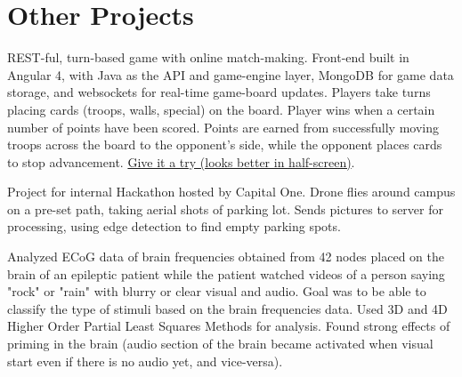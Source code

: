 \documentclass[letterpaper]{deedy-resume-openfont} %
\begin{document}
\begin{minipage}[t]{0.7\textwidth}
\sectionsep %


\section{Other Projects}



REST-ful, turn-based game with online match-making. Front-end built in Angular 4, with Java as the API and game-engine layer, MongoDB for game data storage, and websockets for real-time game-board updates. Players take turns placing cards (troops, walls, special) on the board. Player wins when a certain number of points have been scored. Points are earned from successfully moving troops across the board to the opponent's side, while the opponent places cards to stop advancement. \href{http://3.85.160.165:4200/}{Give it a try (looks better in half-screen)}.

\sectionsep %


Project for internal Hackathon hosted by Capital One. Drone flies around campus on a pre-set path, taking aerial shots of parking lot. Sends pictures to server for processing, using edge detection to find empty parking spots. 

\sectionsep %



Analyzed ECoG data of brain frequencies obtained from 42 nodes placed on the brain of an epileptic patient while the patient watched videos of a person saying "rock" or "rain" with blurry or clear visual and audio. Goal was to be able to classify the type of stimuli based on the brain frequencies data. Used 3D and 4D Higher Order Partial Least Squares Methods for analysis. Found strong effects of priming in the brain (audio section of the brain became activated when visual start even if there is no audio yet, and vice-versa).


\end{minipage}
\end{document}
